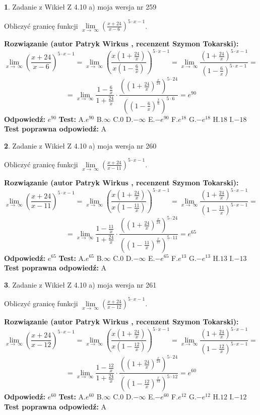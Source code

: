 \documentclass[12pt, a4paper]{article}
\theoremstyle{definition} %
\newtheorem{zad}{}
\newcommand{\zadStart}[1]{\begin{zad}#1\newline}
\newcommand{\zadStop}{\end{zad}}
\newcommand{\rozwStart}[2]{\noindent \textbf{Rozwiązanie (autor #1 , recenzent #2): }\newline}
\newcommand{\rozwStop}{\newline}
\newcommand{\odpStart}{\noindent \textbf{Odpowiedź:}\newline}
\newcommand{\odpStop}{\newline}
\newcommand{\testStart}{\noindent \textbf{Test:}\newline}
\newcommand{\testStop}{\newline}
\newcommand{\kluczStart}{\noindent \textbf{Test poprawna odpowiedź:}\newline}
\newcommand{\kluczStop}{\newline}
\begin{document}
\zadStart{Zadanie z Wikieł Z 4.10 a) moja wersja nr 259}

Obliczyć granicę funkcji  $\lim\limits_{x\to\ \infty}(\frac{x+24}{x-6})^{5\cdot x-1}$.
\zadStop
\rozwStart{Patryk Wirkus}{Szymon Tokarski}
$$\lim\limits_{x\to\ \infty}(\frac{x+24}{x-6})^{5\cdot x-1} = \lim\limits_{x\to\ \infty}(\frac{x(1+\frac{24}{x})}{x(1-\frac{6}{x})})^{5\cdot x-1}=\lim\limits_{x\to\ \infty}\frac{(1+\frac{24}{x})^{5\cdot x-1}}{(1-\frac{6}{x})^{5\cdot x-1}}=$$
$$=\lim\limits_{x\to\ \infty}\frac{1-\frac{6}{x}}{1+\frac{24}{x}}\cdot\frac{((1+\frac{24}{x})^{\frac{x}{24}})^{5\cdot24}}{((1-\frac{6}{x})^{\frac{x}{6}})^{5\cdot6}}=e^{90}$$
\rozwStop
\odpStart
$e^{90}$
\odpStop
\testStart
A.$e^{90}$ B.$\infty$ C.$0$ D.$-\infty$ E.$-e^{90}$
F.$e^{18}$ G.$-e^{18}$
H.$18$
I.$-18$
\testStop
\kluczStart
A
\kluczStop



\zadStart{Zadanie z Wikieł Z 4.10 a) moja wersja nr 260}

Obliczyć granicę funkcji  $\lim\limits_{x\to\ \infty}(\frac{x+24}{x-11})^{5\cdot x-1}$.
\zadStop
\rozwStart{Patryk Wirkus}{Szymon Tokarski}
$$\lim\limits_{x\to\ \infty}(\frac{x+24}{x-11})^{5\cdot x-1} = \lim\limits_{x\to\ \infty}(\frac{x(1+\frac{24}{x})}{x(1-\frac{11}{x})})^{5\cdot x-1}=\lim\limits_{x\to\ \infty}\frac{(1+\frac{24}{x})^{5\cdot x-1}}{(1-\frac{11}{x})^{5\cdot x-1}}=$$
$$=\lim\limits_{x\to\ \infty}\frac{1-\frac{11}{x}}{1+\frac{24}{x}}\cdot\frac{((1+\frac{24}{x})^{\frac{x}{24}})^{5\cdot24}}{((1-\frac{11}{x})^{\frac{x}{11}})^{5\cdot11}}=e^{65}$$
\rozwStop
\odpStart
$e^{65}$
\odpStop
\testStart
A.$e^{65}$ B.$\infty$ C.$0$ D.$-\infty$ E.$-e^{65}$
F.$e^{13}$ G.$-e^{13}$
H.$13$
I.$-13$
\testStop
\kluczStart
A
\kluczStop



\zadStart{Zadanie z Wikieł Z 4.10 a) moja wersja nr 261}

Obliczyć granicę funkcji  $\lim\limits_{x\to\ \infty}(\frac{x+24}{x-12})^{5\cdot x-1}$.
\zadStop
\rozwStart{Patryk Wirkus}{Szymon Tokarski}
$$\lim\limits_{x\to\ \infty}(\frac{x+24}{x-12})^{5\cdot x-1} = \lim\limits_{x\to\ \infty}(\frac{x(1+\frac{24}{x})}{x(1-\frac{12}{x})})^{5\cdot x-1}=\lim\limits_{x\to\ \infty}\frac{(1+\frac{24}{x})^{5\cdot x-1}}{(1-\frac{12}{x})^{5\cdot x-1}}=$$
$$=\lim\limits_{x\to\ \infty}\frac{1-\frac{12}{x}}{1+\frac{24}{x}}\cdot\frac{((1+\frac{24}{x})^{\frac{x}{24}})^{5\cdot24}}{((1-\frac{12}{x})^{\frac{x}{12}})^{5\cdot12}}=e^{60}$$
\rozwStop
\odpStart
$e^{60}$
\odpStop
\testStart
A.$e^{60}$ B.$\infty$ C.$0$ D.$-\infty$ E.$-e^{60}$
F.$e^{12}$ G.$-e^{12}$
H.$12$
I.$-12$
\testStop
\kluczStart
A
\kluczStop
\end{document}
